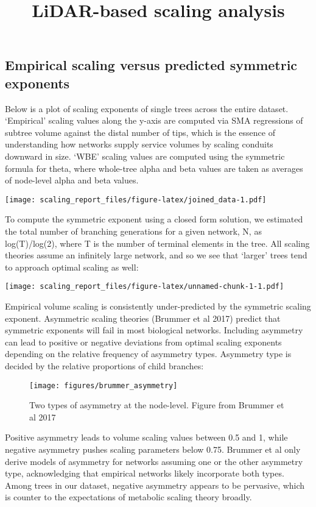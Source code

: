\documentclass[]{article}
\title{LiDAR-based scaling analysis}
\author{}
\date{}
\begin{document}
\maketitle

\subsection{Empirical scaling versus predicted symmetric
exponents}\label{empirical-scaling-versus-predicted-symmetric-exponents}

Below is a plot of scaling exponents of single trees across the entire
dataset. `Empirical' scaling values along the y-axis are computed via
SMA regressions of subtree volume against the distal number of tips,
which is the essence of understanding how networks supply service
volumes by scaling conduits downward in size. `WBE' scaling values are
computed using the symmetric formula for theta, where whole-tree alpha
and beta values are taken as averages of node-level alpha and beta
values.

\texttt{[image: scaling\_report\_files/figure-latex/joined\_data-1.pdf]}

To compute the symmetric exponent using a closed form solution, we
estimated the total number of branching generations for a given network,
N, as log(T)/log(2), where T is the number of terminal elements in the
tree. All scaling theories assume an infinitely large network, and so we
see that `larger' trees tend to approach optimal scaling as well:

\texttt{[image: scaling\_report\_files/figure-latex/unnamed-chunk-1-1.pdf]}

Empirical volume scaling is consistently under-predicted by the
symmetric scaling exponent. Asymmetric scaling theories (Brummer et al
2017) predict that symmetric exponents will fail in most biological
networks. Including asymmetry can lead to positive or negative
deviations from optimal scaling exponents depending on the relative
frequency of asymmetry types. Asymmetry type is decided by the relative
proportions of child branches:

\begin{figure}
\texttt{[image: figures/brummer\_asymmetry]} \caption{Two types of asymmetry at the node-level. Figure from Brummer et al 2017}\label{fig:pressure}
\end{figure}

Positive asymmetry leads to volume scaling values between 0.5 and 1,
while negative asymmetry pushes scaling parameters below 0.75. Brummer
et al only derive models of asymmetry for networks assuming one or the
other asymmetry type, acknowledging that empirical networks likely
incorporate both types. Among trees in our dataset, negative asymmetry
appears to be pervasive, which is counter to the expectations of
metabolic scaling theory broadly.
\end{document}
